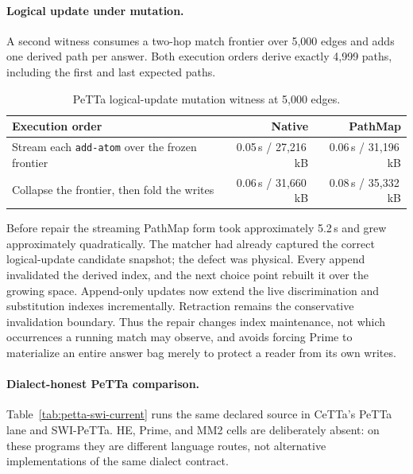 \documentclass[11pt]{article}
\newcommand{\code}[1]{\texttt{#1}}
\newcommand{\PeTTa}{\textup{PeTTa}}
\newcommand{\CeTTa}{\textup{CeTTa}}
\newcommand{\PathMap}{\textup{PathMap}}
\begin{document}
\paragraph{Logical update under mutation.}
A second witness consumes a two-hop match frontier over 5{,}000 edges and
adds one derived path per answer.  Both execution orders derive exactly
4{,}999 paths, including the first and last expected paths.

\begin{table}[htbp]
\centering
\begin{tabular}{lrr}
\toprule
Execution order & Native & \PathMap{} \\
\midrule
Stream each \code{add-atom} over the frozen frontier
  & 0.05\,s / 27{,}216\,kB & 0.06\,s / 31{,}196\,kB \\
Collapse the frontier, then fold the writes
  & 0.06\,s / 31{,}660\,kB & 0.08\,s / 35{,}332\,kB \\
\bottomrule
\end{tabular}
\caption{PeTTa logical-update mutation witness at 5{,}000 edges.}
\label{tab:petta-pathmap-logical-update}
\end{table}

Before repair the streaming \PathMap{} form took approximately 5.2\,s and
grew approximately quadratically.  The matcher had already captured the
correct logical-update candidate snapshot; the defect was physical.  Every
append invalidated the derived index, and the next choice point rebuilt it
over the growing space.  Append-only updates now extend the live
discrimination and substitution indexes incrementally.  Retraction remains
the conservative invalidation boundary.  Thus the repair changes index
maintenance, not which occurrences a running match may observe, and avoids
forcing Prime to materialize an entire answer bag merely to protect a reader
from its own writes.

\paragraph{Dialect-honest \PeTTa{} comparison.}
Table~\ref{tab:petta-swi-current} runs the same declared source in \CeTTa{}'s
\PeTTa{} lane and SWI-\PeTTa{}.  HE, Prime, and MM2 cells are deliberately
absent: on these programs they are different language routes, not alternative
implementations of the same dialect contract.
\end{document}
